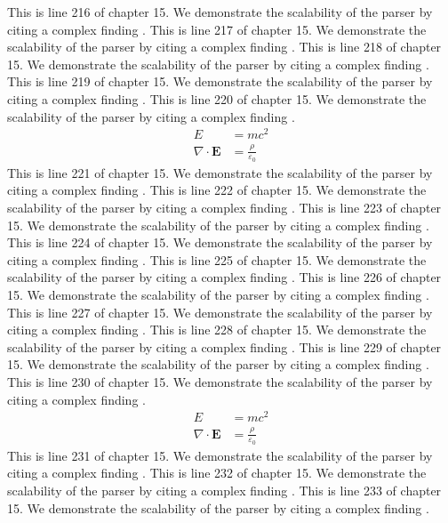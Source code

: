 This is line 216 of chapter 15. We demonstrate the scalability of the parser by citing a complex finding \cite{ref15_216}.
This is line 217 of chapter 15. We demonstrate the scalability of the parser by citing a complex finding \cite{ref15_217}.
This is line 218 of chapter 15. We demonstrate the scalability of the parser by citing a complex finding \cite{ref15_218}.
This is line 219 of chapter 15. We demonstrate the scalability of the parser by citing a complex finding \cite{ref15_219}.
This is line 220 of chapter 15. We demonstrate the scalability of the parser by citing a complex finding \cite{ref15_220}.
\begin{align*}
  E &= mc^2 \\
  \nabla \cdot \mathbf{E} &= \frac{\rho}{\varepsilon_0}
\end{align*}
This is line 221 of chapter 15. We demonstrate the scalability of the parser by citing a complex finding \cite{ref15_221}.
This is line 222 of chapter 15. We demonstrate the scalability of the parser by citing a complex finding \cite{ref15_222}.
This is line 223 of chapter 15. We demonstrate the scalability of the parser by citing a complex finding \cite{ref15_223}.
This is line 224 of chapter 15. We demonstrate the scalability of the parser by citing a complex finding \cite{ref15_224}.
This is line 225 of chapter 15. We demonstrate the scalability of the parser by citing a complex finding \cite{ref15_225}.
This is line 226 of chapter 15. We demonstrate the scalability of the parser by citing a complex finding \cite{ref15_226}.
This is line 227 of chapter 15. We demonstrate the scalability of the parser by citing a complex finding \cite{ref15_227}.
This is line 228 of chapter 15. We demonstrate the scalability of the parser by citing a complex finding \cite{ref15_228}.
This is line 229 of chapter 15. We demonstrate the scalability of the parser by citing a complex finding \cite{ref15_229}.
This is line 230 of chapter 15. We demonstrate the scalability of the parser by citing a complex finding \cite{ref15_230}.
\begin{align*}
  E &= mc^2 \\
  \nabla \cdot \mathbf{E} &= \frac{\rho}{\varepsilon_0}
\end{align*}
This is line 231 of chapter 15. We demonstrate the scalability of the parser by citing a complex finding \cite{ref15_231}.
This is line 232 of chapter 15. We demonstrate the scalability of the parser by citing a complex finding \cite{ref15_232}.
This is line 233 of chapter 15. We demonstrate the scalability of the parser by citing a complex finding \cite{ref15_233}.
